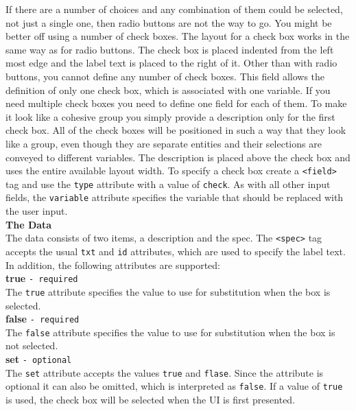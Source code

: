 If there are a number of choices and any combination of them could be
selected, not just a single one, then radio buttons are not the way to
go. You might be better off using a number of check boxes. The layout
for a check box works in the same way as for radio buttons. The check
box is placed indented from the left most edge and the label text is
placed to the right of it. Other than with radio buttons, you cannot
define any number of check boxes. This field allows the definition of
only one check box, which is associated with one variable. If you need
multiple check boxes you need to define one field for each of them.  To
make it look like a cohesive group you simply provide a description only
for the first check box. All of the check boxes will be positioned in
such a way that they look like a group, even though they are separate
entities and their selections are conveyed to different variables. The
description  is placed above the check box and uses the entire available
layout width. To specify a check box create a \texttt{<field>} tag and
use the \texttt{type} attribute with a value of \texttt{check}. As with
all other input fields, the \texttt{variable} attribute specifies the
variable that should be replaced with the user input.\\

\textbf{The Data}\\

The data consists of two items, a description and the spec. The
\texttt{<spec>} tag accepts the usual \texttt{txt} and \texttt{id}
attributes, which are used to specify the label text. In addition, the
following attributes are supported:\\

\textbf{true} \texttt{- required}\\

The \texttt{true} attribute specifies the value to use for substitution
when the box is selected.\\

\textbf{false} \texttt{- required}\\

The \texttt{false} attribute specifies the value to use for substitution
when the box is not selected.\\

\textbf{set} \texttt{- optional}\\

The \texttt{set} attribute accepts the values \texttt{true} and
\texttt{flase}. Since the attribute is optional it can also be omitted,
which is interpreted as \texttt{false}. If a value of \texttt{true} is
used, the check box will be selected when the UI is first presented.\\

